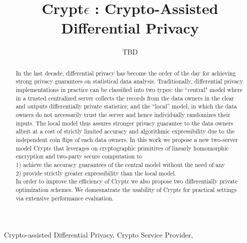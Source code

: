 \documentclass{article}
\title{Crypt$\epsilon$ : Crypto-Assisted Differential Privacy}
\author{TBD}
\begin{document}
\maketitle

\begin{abstract}
In the last decade, differential privacy has become the order of the day for achieving strong privacy guarantees on statistical data analysis. Traditionally, differential privacy implementations in practice can be classified into two types: the “central" model where in a trusted centralized server collects the records from the data owners in the clear and outputs differentially private statistics; and the “local” model, in which the data owners do not necessarily trust the server and hence individually randomizes their inputs. The local model thus assures stronger privacy guarantee to the data owners albeit at a cost of strictly limited accuracy and algorithmic expressibility due to the independent coin flips of each data owners. In this work we propose a new two-server model Crypt$\epsilon$ that leverages on cryptographic primitives of linearly homomorphic encryption and two-party secure computation to  \\
1) achieve the accuracy guarantees of the central model without the need of any \\
2) provide strictly greater expressibility than the local model. \\
In order to improve the efficiency of Crypt$\epsilon$ we also propose two differentially private optimization schemes.  We domesnatrate the usability of Crypt$\epsilon$ for practical settings via extensive performance evaluation.
\end{abstract}

Crypto-assisted Differential Privacy, Crypto Service Provider, 





%








\end{document}
